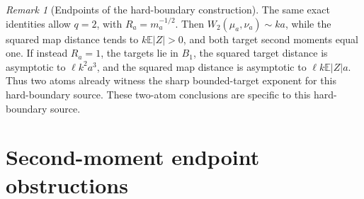 \documentclass[11pt]{article}
\numberwithin{equation}{section}
\theoremstyle{remark}
\newtheorem{remark}[theorem]{Remark}
\newcommand{\E}{\mathbb E}
\begin{document}
\begin{remark}[Endpoints of the hard-boundary construction]
The same exact identities allow $q=2$, with $R_a=m_a^{-1/2}$. Then $W_2(\mu_a,\nu_a)\sim ka$, while the squared map distance tends to $k\E|Z|>0$, and both target second moments equal one. If instead $R_a=1$, the targets lie in $B_1$, the squared target distance is asymptotic to $\ell k^2a^3$, and the squared map distance is asymptotic to $\ell k\E|Z|a$. Thus two atoms already witness the sharp bounded-target exponent for this hard-boundary source. These two-atom conclusions are specific to this hard-boundary source.
\end{remark}

\section{Second-moment endpoint obstructions}\label{sec:endpoint}
\end{document}
